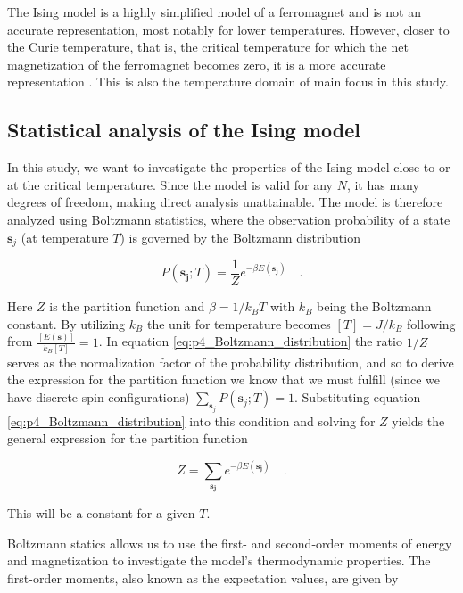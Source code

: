 \documentclass[../main_proj4_correct_template.tex]{subfiles}
\begin{document}
The Ising model is a highly simplified model of a ferromagnet and is not an accurate representation, most notably for lower temperatures. However, closer to the Curie temperature, that is, the critical temperature for which the net magnetization of the ferromagnet becomes zero, it is a more accurate representation \cite{thermal_physics}. This is also the temperature domain of main focus in this study.

\subsection{Statistical analysis of the Ising model}

In this study, we want to investigate the properties of the Ising model close to or at the critical temperature. Since the model is valid for any $N$, it has many degrees of freedom, making direct analysis unattainable. The model is therefore analyzed using Boltzmann statistics, where the observation probability of a state $\mathbf{s}_j$ (at temperature $T$) is governed by the Boltzmann distribution

\begin{equation}
\label{eq:p4_Boltzmann_distribution}
    P(\mathbf{s_j}; T) = \frac{1}{Z} e ^{-\beta E(\mathbf{s_j})} \quad.
\end{equation}

\noindent Here $Z$ is the partition function and $\beta=1 / k_B T$ with $k_B$ being the Boltzmann constant. By utilizing $k_B$  the unit for temperature becomes $[T] = J/k_B$ following from $\frac{[E(\mathbf{s})]}{k_B[T]} = 1$. In equation \eqref{eq:p4_Boltzmann_distribution} the ratio $1 / Z$ serves as the normalization factor of the probability distribution, and so to derive the expression for the partition function we know that we must fulfill (since we have discrete spin configurations) $\sum_{\mathbf{s}_{j}} P(\mathbf{s}_j;T) = 1$. Substituting equation \eqref{eq:p4_Boltzmann_distribution} into this condition and solving for $Z$ yields the general expression for the partition function

\begin{equation}
    \label{eq:p4_partition_function}
    Z = \sum\limits_{\mathbf{s_j}} e^{-\beta E(\mathbf{s_j})} \quad .
\end{equation}

\noindent This will be a constant for a given $T$.

Boltzmann statics allows us to use the first- and second-order moments of energy and magnetization to investigate the model's thermodynamic properties. The first-order moments, also known as the expectation values, are given by 
\end{document}
